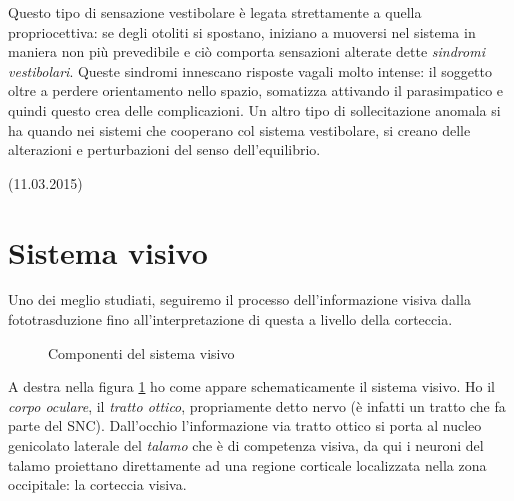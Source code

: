 \documentclass[a4paper,12pt]{article}
\begin{document}
Questo tipo di sensazione vestibolare è legata strettamente a quella propriocettiva: se degli otoliti si spostano, iniziano a muoversi nel sistema in maniera non più prevedibile e ciò comporta sensazioni alterate dette \emph{sindromi vestibolari}. Queste sindromi innescano risposte vagali molto intense: il soggetto oltre a perdere orientamento nello spazio, somatizza attivando il parasimpatico e quindi questo crea delle complicazioni. Un altro tipo di sollecitazione anomala si ha quando nei sistemi che cooperano col sistema vestibolare, si creano delle alterazioni e perturbazioni del senso dell'equilibrio. 	

(11.03.2015)

\section{Sistema visivo}

Uno dei meglio studiati, seguiremo il processo dell'informazione visiva dalla fototrasduzione fino all'interpretazione di questa a livello della corteccia. 

\begin{figure}[H]
 \centering
  \quad
{}
    \caption{Componenti del sistema visivo}
    \label{img:oc}
\end{figure}

A destra nella figura \ref{img:oc} ho come appare schematicamente il sistema visivo. Ho il \emph{corpo oculare}, il \emph{tratto ottico}, propriamente detto nervo (è infatti un tratto che fa parte del SNC). Dall'occhio l'informazione via tratto ottico si porta al nucleo genicolato laterale del \emph{talamo} che è di competenza visiva, da qui i neuroni del talamo proiettano direttamente ad una regione corticale localizzata nella zona occipitale: la corteccia visiva.
\end{document}
